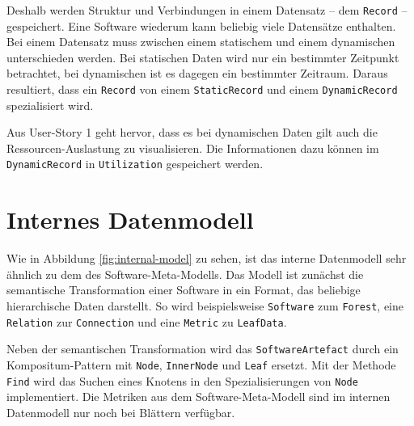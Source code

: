 Deshalb werden Struktur und Verbindungen in einem Datensatz -- dem \texttt{Record} -- gespeichert. Eine Software wiederum kann beliebig viele Datensätze enthalten. Bei einem Datensatz muss zwischen einem statischem und einem dynamischen unterschieden werden. Bei statischen Daten wird nur ein bestimmter Zeitpunkt betrachtet, bei dynamischen ist es dagegen ein bestimmter Zeitraum. Daraus resultiert, dass ein \texttt{Record} von einem \texttt{StaticRecord} und einem \texttt{DynamicRecord} spezialisiert wird.

Aus User-Story 1 geht hervor, dass es bei dynamischen Daten gilt auch die Ressourcen-Auslastung zu visualisieren. Die Informationen dazu können im \texttt{DynamicRecord} in \texttt{Utilization} gespeichert werden.

\section{Internes Datenmodell}
\label{sec:app-model}

Wie in Abbildung \ref{fig:internal-model} zu sehen, ist das interne Datenmodell sehr ähnlich zu dem des Software-Meta-Modells. Das Modell ist zunächst die semantische Transformation einer Software in ein Format, das beliebige hierarchische Daten darstellt. So wird beispielsweise \texttt{Software} zum \texttt{Forest}, eine \texttt{Relation} zur \texttt{Connection} und eine \texttt{Metric} zu \texttt{LeafData}.

Neben der semantischen Transformation wird das \texttt{SoftwareArtefact} durch ein Kompositum-Pattern mit \texttt{Node}, \texttt{InnerNode} und \texttt{Leaf} ersetzt. Mit der Methode \texttt{Find} wird das Suchen eines Knotens in den Spezialisierungen von \texttt{Node} implementiert. Die Metriken aus dem Software-Meta-Modell sind im internen Datenmodell nur noch bei Blättern verfügbar.

